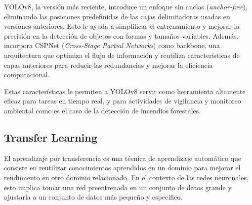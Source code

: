 YOLOv8, la versión más reciente, introduce un enfoque sin anclas (\textit{anchor-free}),
eliminando las posiciones predefinidas de las cajas delimitadoras usadas en versiones
anteriores. Esto le ayuda a simplificar el entrenamiento y mejorar la precisión en la
detección de objetos con formas y tamaños variables. Además, incorpora CSPNet
(\textit{Cross-Stage Partial Networks}) como backbone, una arquitectura que optimiza el
flujo de información y reutiliza características de capas anteriores para reducir las
redundancias y mejorar la eficiencia computacional.

Estas características le permiten a YOLOv8 servir como herramienta altamente eficaz para
tareas en tiempo real, y para actividades de vigilancia y monitoreo ambiental como es el
caso de la detección de incendios forestales.

\subsection{Transfer Learning}
El aprendizaje por transferencia es una técnica de aprendizaje automático que consiste
en reutilizar conocimientos aprendidos en un dominio para mejorar el rendimiento en otro
dominio relacionado. En el contexto de las redes neuronales, esto implica tomar una red
preentrenada en un conjunto de datos grande y ajustarla a un conjunto de datos más
pequeño y específico.
